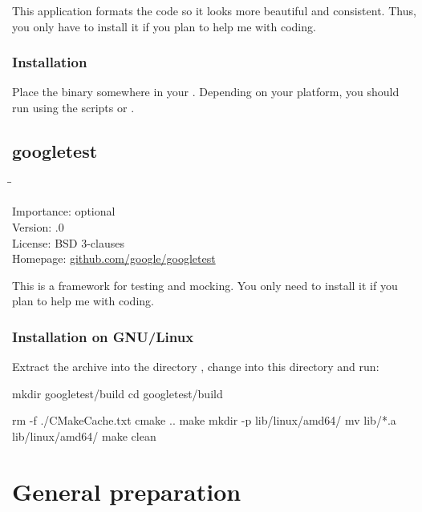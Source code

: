 This application formats the code so it looks more beautiful and
consistent.  Thus, you only have to install it if you plan to help me
with coding.

\subsubsection{Installation}

Place the binary somewhere in your .  Depending on your
platform, you should run  using the scripts
 or .

\subsection{googletest}

\begin{tabbing}
  \hspace*{6em}\=\=\kill

  Importance:  \> optional \\
  Version:     .0 \\
  License:     \> BSD 3-clauses \\
  Homepage:    \> \href{https://github.com/google/googletest}{github.com/google/googletest}
\end{tabbing}

This is a framework for testing and mocking.  You only need to install
it if you plan to help me with coding.

\subsubsection{Installation on GNU/Linux}

Extract the archive into the directory ,
change into this directory and run:

\begin{VerbatimBoth}
  mkdir googletest/build
  cd googletest/build
\end{VerbatimBoth}

\begin{Verbatim64}
  rm -f ./CMakeCache.txt
  cmake ..
  make
  mkdir -p lib/linux/amd64/
  mv lib/*.a lib/linux/amd64/
  make clean
\end{Verbatim64}

\section{General preparation}
\label{sec:general_preparation}


